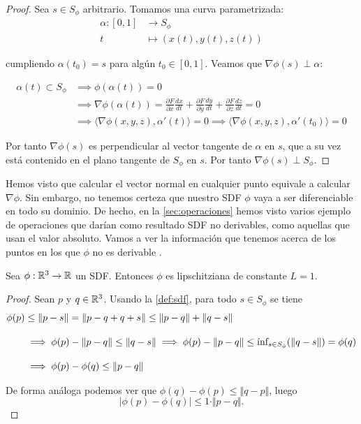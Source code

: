 \begin{proof}
  Sea $s\in S_\phi$ arbitrario. Tomamos una curva parametrizada:
  \begin{align*}
    \alpha \colon [0,1] & \to S_\phi                             \\
    t                   & \mapsto \left(x(t), y(t), z(t) \right)
  \end{align*}

  cumpliendo $\alpha(t_0)=s$ para algún $t_0\in [0,1]$. Veamos que $\nabla\phi(s) \perp \alpha$:

  \begin{align*}
    \alpha(t)\subset S_\phi & \implies \phi(\alpha(t))=0\\
                            & \implies \nabla\phi(\alpha(t)) = \frac{\partial{F}}{\partial{x}}\frac{dx}{dt} + \frac{\partial{F}}{\partial{y}}\frac{dy}{dt} + \frac{\partial{F}}{\partial{z}}\frac{dz}{dt} = 0 \\
                            & \implies \langle \nabla\phi(x,y,z), \alpha'(t)\rangle = 0 \implies \langle \nabla\phi(x,y,z), \alpha'(t_0)\rangle = 0
  \end{align*}

    Por tanto $\nabla\phi(s)$ es perpendicular al vector tangente de $\alpha$ en $s$, que a su vez está contenido en el plano tangente de $S_\phi$ en $s$. Por tanto $\nabla\phi(s) \perp S_\phi$.
\end{proof}

Hemos visto que calcular el vector normal en cualquier punto equivale a calcular $\nabla\phi$. Sin embargo, no tenemos certeza que nuestro SDF $\phi$ vaya a ser diferenciable en todo su dominio. De hecho, en la \autoref{sec:operaciones} hemos visto varios ejemplo de operaciones que darían como resultado SDF no derivables, como aquellas que usan el valor absoluto. Vamos a ver la información que tenemos acerca de los puntos en los que $\phi$ no es derivable \cite{derivWiki}.

\begin{lema}
    Sea $\phi:\R^3\to \R$ un SDF. Entonces $\phi$ es lipschitziana de constante $L=1$.
\end{lema}
\begin{proof}
    Sean $p$ y $q\in \R^3$. Usando la \autoref{def:sdf}, para todo $s\in S_{\phi}$ se tiene
    \begin{align*}
        \phi(p) &\le \Vert p-s\Vert = \Vert p-q+q+s\Vert \le \Vert p-q\Vert + \Vert q-s\Vert\\[10pt] 
        &\implies \phi(p) - \Vert p-q\Vert \le \Vert q-s \Vert \implies  \phi(p) - \Vert p-q\Vert \le \Inf_{s\in S_{\phi}}(\Vert q-s \Vert) = \phi(q)\\[10pt]
        &\implies \phi(p) - \phi(q) \le \Vert p-q \Vert
    \end{align*}

    De forma análoga podemos ver que $\phi(q) - \phi(p) \le \Vert q-p \Vert$, luego
    \begin{equation*}
        \vert \phi(p) - \phi(q)\vert \le 1\cdot \Vert p-q\Vert.
    \end{equation*}
\end{proof}

